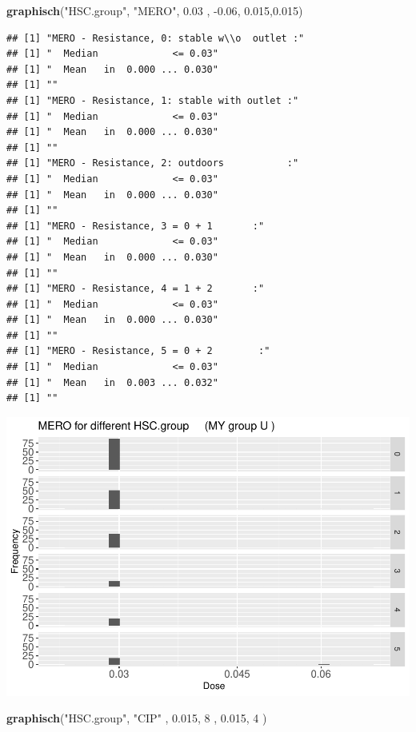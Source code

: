 \documentclass[
]{article}
\newenvironment{Shaded}{\begin{snugshade}}{\end{snugshade}}
\newcommand{\DecValTok}[1]{\textcolor[rgb]{0.00,0.00,0.81}{#1}}
\newcommand{\FloatTok}[1]{\textcolor[rgb]{0.00,0.00,0.81}{#1}}
\newcommand{\KeywordTok}[1]{\textcolor[rgb]{0.13,0.29,0.53}{\textbf{#1}}}
\newcommand{\NormalTok}[1]{#1}
\newcommand{\StringTok}[1]{\textcolor[rgb]{0.31,0.60,0.02}{#1}}
\begin{document}
\begin{Shaded}
\begin{Highlighting}[]
  \KeywordTok{graphisch}\NormalTok{(}\StringTok{"HSC.group"}\NormalTok{, }\StringTok{"MERO"}\NormalTok{, }\FloatTok{0.03}\NormalTok{ ,  }\FloatTok{-0.06}\NormalTok{,   }\FloatTok{0.015}\NormalTok{,}\FloatTok{0.015}\NormalTok{)}
\end{Highlighting}
\end{Shaded}

\begin{verbatim}
## [1] "MERO - Resistance, 0: stable w\\o  outlet :"
## [1] "  Median             <= 0.03"
## [1] "  Mean   in  0.000 ... 0.030"
## [1] ""
## [1] "MERO - Resistance, 1: stable with outlet :"
## [1] "  Median             <= 0.03"
## [1] "  Mean   in  0.000 ... 0.030"
## [1] ""
## [1] "MERO - Resistance, 2: outdoors           :"
## [1] "  Median             <= 0.03"
## [1] "  Mean   in  0.000 ... 0.030"
## [1] ""
## [1] "MERO - Resistance, 3 = 0 + 1       :"
## [1] "  Median             <= 0.03"
## [1] "  Mean   in  0.000 ... 0.030"
## [1] ""
## [1] "MERO - Resistance, 4 = 1 + 2       :"
## [1] "  Median             <= 0.03"
## [1] "  Mean   in  0.000 ... 0.030"
## [1] ""
## [1] "MERO - Resistance, 5 = 0 + 2        :"
## [1] "  Median             <= 0.03"
## [1] "  Mean   in  0.003 ... 0.032"
## [1] ""
\end{verbatim}

\includegraphics{Verteilungen_files/figure-latex/unnamed-chunk-45-1.pdf}

\begin{Shaded}
\begin{Highlighting}[]
  \KeywordTok{graphisch}\NormalTok{(}\StringTok{"HSC.group"}\NormalTok{, }\StringTok{"CIP"}\NormalTok{ , }\FloatTok{0.015}\NormalTok{,   }\DecValTok{8}\NormalTok{   ,   }\FloatTok{0.015}\NormalTok{,   }\DecValTok{4}\NormalTok{    ) }
\end{Highlighting}
\end{Shaded}
\end{document}
